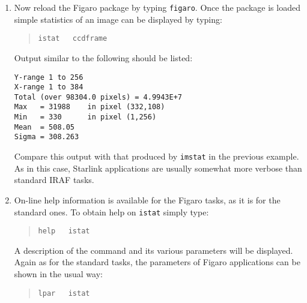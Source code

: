 \documentclass[twoside,11pt]{article}
\begin{document}
\begin{enumerate}
\begin{itemize}
  \end{itemize}

   Any number of packages can be loaded simultaneously.  All the
   commands in all the loaded packages are available.  Packages are
   hierarchical, with packages having sub-packages inside 'em, and so {\it
   ad infinitum}\, (as the poet almost had it).  Typing {\tt bye} removes
   the most recently loaded package or sub-package.  For example, type:

  \begin{quote}
   {\tt bye}
  \end{quote}

   Figaro will be removed and the prompt will be reset to \verb-cl>-.

  \item Now reload the Figaro package by typing {\tt figaro}.  Once the
   package is loaded simple statistics of an image can be displayed by
   typing:

  \begin{quote}
   {\tt istat ~ ccdframe}
  \end{quote}

   Output similar to the following should be listed:

  \begin{verbatim}
Y-range 1 to 256
X-range 1 to 384
Total (over 98304.0 pixels) = 4.9943E+7
Max   = 31988    in pixel (332,108)
Min   = 330      in pixel (1,256)
Mean  = 508.05
Sigma = 308.263
  \end{verbatim}

   Compare this output with that produced by {\tt imstat} in the previous
   example.  As in this case, Starlink applications are usually
   somewhat more verbose than standard IRAF tasks.

  \item On-line help information is available for the Figaro tasks,
   as it is for the standard ones.  To obtain help on {\tt istat} simply
   type:

  \begin{quote}
   {\tt help ~ istat}
  \end{quote}

   A description of the command and its various parameters will be
   displayed.  Again as for the standard tasks, the parameters of
   Figaro applications can be shown in the usual way:

  \begin{quote}
   {\tt lpar ~ istat}
  \end{quote}


\end{enumerate}
\end{document}
